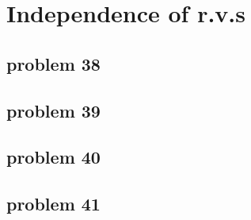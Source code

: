 \section{Independence of r.v.s}

\subsection{problem 38}


\subsection{problem 39}


\subsection{problem 40}


\subsection{problem 41}

